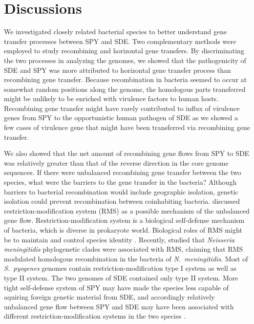\documentclass[english]{article}
\begin{document}

\section{Discussions}

We investigated closely related bacterial species to better understand gene
transfer processes between SPY and SDE. Two complementary methods were employed
to study recombining and horizontal gene transfers. By discriminating the two
processes in analyzing the genomes, we showed that the pathogenicity of SDE and
SPY was more attributed to horizontal gene transfer process than recombining
gene transfer.  Because recombination in bacteria seemed to occur at somewhat
random positions along the genome, the homologous parts transferred might be
unlikely to be enriched with virulence factors to human hosts.  Recombining gene
transfer might have rarely contributed to influx of virulence genes from SPY to
the opportunistic human pathogen of SDE as we showed a few cases of virulence
gene that might have been transferred via recombining gene transfer.

We also showed that the net amount of recombining gene flows from SPY to SDE was
relatively greater than that of the reverse direction in the core genome
sequences.  If there were unbalanced recombining gene transfer between the two
species, what were the barriers \citep{Thomas2005} to the gene transfer in the
bacteria? Although barriers to bacterial recombination would include geographic
isolation, genetic isolation could prevent recombination between coinhabiting
bacteria.  \citet{Kalia2001} discussed restriction-modification system (RMS) as
a possible mechanism of the unbalanced gene flow.  Restriction-modification
system is a biological self-defense mechanism of bacteria, which is diverse in
prokaryote world.  Biological roles of RMS might be to maintain and control
species identity \citep{Jeltsch2003}.  Recently, \citet{Budroni2011a} studied
that \textit{Neisseria meningitidis} phylogenetic clades were associated with
RMS, claiming that RMS modulated homologous recombination in the bacteria of
\textit{N.\ meningitidis}.  Most of \textit{S.\ pyogenes} genomes contain
restriction-modification type I system as well as type II system. The two
genomes of SDE contained only type II system. More tight self-defense system of
SPY may have made the species less capable of aquiring foreign genetic material
from SDE, and accordingly relatively unbalanced gene flow between SPY and SDE
may have been associated with different restriction-modification systems in the
two species \citep{Kalia2001}.  
\end{document}
